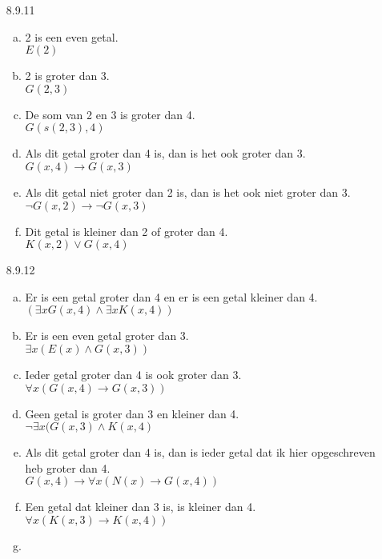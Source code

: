 \begin{enumerate}
  \item[8.9.11]
    \begin{enumerate}[(a)]
      \item
        2 is een even getal.\\
        $E(2)$
      \item
        2 is groter dan 3.\\
        $G(2,3)$
      \item
        De som van 2 en 3 is groter dan 4.\\
        $G(s(2,3),4)$
      \item
        Als dit getal groter dan 4 is, dan is het ook groter dan 3.\\
        $G(x,4) \rightarrow G(x,3)$
      \item
        Als dit getal niet groter dan 2 is, dan is het ook niet groter dan 3.\\
        $\neg G(x,2) \rightarrow \neg G(x,3)$
      \item
        Dit getal is kleiner dan 2 of groter dan 4.\\
        $K(x,2) \vee G(x,4)$
    \end{enumerate}
  \item[8.9.12]
    \begin{enumerate}[(a)]
      \item
        Er is een getal groter dan 4 en er is een getal kleiner dan 4.\\
        $(\exists x G(x,4) \land \exists x K(x,4))$
      \item
        Er is een even getal groter dan 3.\\
        $\exists x(E(x) \land G(x,3))$
      \item
        Ieder getal groter dan 4 is ook groter dan 3.\\
        $\forall x (G(x,4) \rightarrow G(x,3))$
      \item
        Geen getal is groter dan 3 en kleiner dan 4.\\
        $\neg \exists x (G(x,3) \land K(x,4)$
      \item
        Als dit getal groter dan 4 is, dan is ieder getal dat ik hier opgeschreven heb groter dan 4.\\
        $G(x,4) \rightarrow \forall x ( N(x) \to G(x,4) )$
      \item
        Een getal dat kleiner dan 3 is, is kleiner dan 4.\\
        $\forall x (K(x,3) \rightarrow K(x,4))$
      \item

\end{enumerate}
\end{enumerate}
